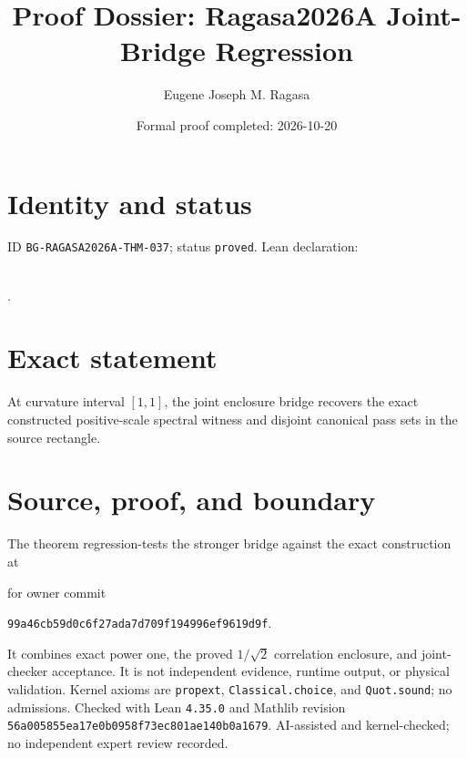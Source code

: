 \documentclass[11pt]{article}
\title{Proof Dossier: Ragasa2026A Joint-Bridge Regression}\author{Eugene Joseph M. Ragasa}\date{Formal proof completed: 2026-10-20}
\begin{document}
\maketitle
\section{Identity and status}
ID \texttt{BG-RAGASA2026A-THM-037}; status \texttt{proved}. Lean declaration:
\par{}\\
{\tiny{}}.
\section{Exact statement}
At curvature interval $[1,1]$, the joint enclosure bridge recovers the exact constructed
positive-scale spectral witness and disjoint canonical pass sets in the source rectangle.
\section{Source, proof, and boundary}
The theorem regression-tests the stronger bridge against the exact construction at
\begin{center}\small{}\end{center}
for owner commit
\begin{center}\small\texttt{99a46cb59d0c6f27ada7d709f194996ef9619d9f}.\end{center}
It combines exact power one, the proved $1/\sqrt2$ correlation enclosure, and joint-checker
acceptance. It is not independent evidence, runtime output, or physical validation. Kernel
axioms are \texttt{propext}, \texttt{Classical.choice}, and \texttt{Quot.sound}; no
admissions. Checked with Lean \texttt{4.35.0} and Mathlib revision
\texttt{56a005855ea17e0b0958f73ec801ae140b0a1679}. AI-assisted and kernel-checked;
no independent expert review recorded.
\end{document}
